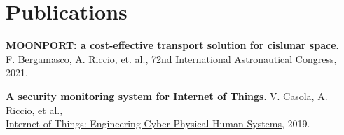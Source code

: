 \documentclass[letterpaper]{twentysecondcv} %
\begin{document}
\section{Publications}
    \href{https://www.researchgate.net/publication/355856343_MOONPORT_A_cost-effective_transport_solution_for_cislunar_space}
    {\textbf{MOONPORT: a cost-effective transport solution for cislunar space}}.\\
    F. Bergamasco, \href{https://scholar.google.com/citations?user=A3XqqTEAAAAJ&hl=it}{A. Riccio}, et. al.,
    \href{https://iafastro.directory/iac/paper/id/63931/summary/}
    {72nd International Astronautical Congress}, 2021.

    \textbf{A security monitoring system for Internet of Things}.
    V. Casola,  \href{https://scholar.google.com/citations?user=A3XqqTEAAAAJ&hl=it}{A. Riccio}, et al.,\\
    \href{https://www.researchgate.net/publication/334175322_A_security_monitoring_system_for_Internet_of_Things}
    {Internet of Things: Engineering Cyber Physical Human Systems}, 2019.
\end{document}
